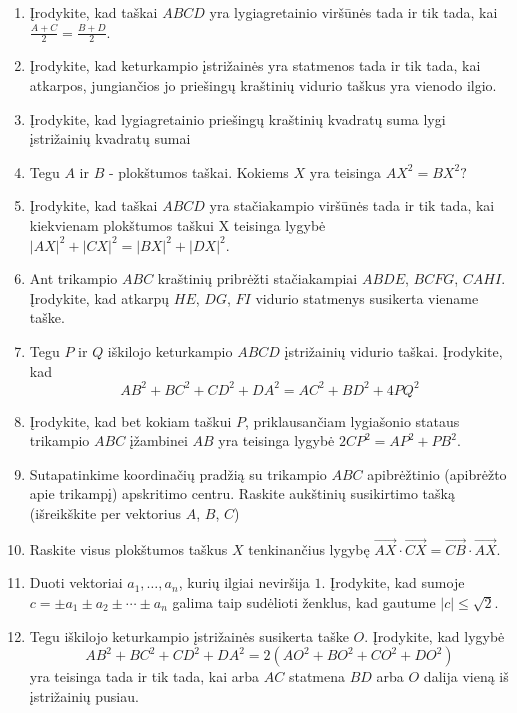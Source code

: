 \begin{enumerate}

\item Įrodykite, kad taškai $ABCD$ yra lygiagretainio viršūnės tada ir tik tada, kai $\frac{A+C}{2} = \frac{B+D}{2}$.

\item Įrodykite, kad keturkampio įstrižainės yra statmenos tada ir tik tada, kai atkarpos, jungiančios jo priešingų kraštinių vidurio taškus yra vienodo ilgio.

\item Įrodykite, kad lygiagretainio priešingų kraštinių kvadratų suma lygi įstrižainių kvadratų sumai

\item Tegu $A$ ir $B$ - plokštumos taškai. Kokiems $X$ yra teisinga $AX^2 = BX^2?$

\item Įrodykite, kad taškai $ABCD$ yra stačiakampio viršūnės tada ir tik tada, kai kiekvienam plokštumos taškui X teisinga lygybė $|AX|^2+ |CX|^2= |BX|^2+ |DX|^2$.

\item Ant trikampio $ABC$ kraštinių pribrėžti stačiakampiai $ABDE$, $BCFG$, $CAHI$. Įrodykite, kad atkarpų $HE$, $DG$, $FI$ vidurio statmenys susikerta viename taške. 

\item Tegu $P$ ir $Q$ iškilojo keturkampio $ABCD$ įstrižainių vidurio taškai. Įrodykite, kad $$AB^2 + BC^2 + CD^2 + DA^2 = AC^2 + BD^2 + 4PQ^2$$  

\item Įrodykite, kad bet kokiam taškui $P$, priklausančiam lygiašonio stataus trikampio $ABC$ įžambinei $AB$ yra teisinga lygybė $2CP^2 = AP^2 + PB^2.$

\item Sutapatinkime koordinačių pradžią su trikampio $ABC$ apibrėžtinio (apibrėžto apie trikampį) apskritimo centru. Raskite aukštinių susikirtimo tašką (išreikškite per vektorius $A$, $B$, $C$) 

\item Raskite visus plokštumos taškus $X$ tenkinančius lygybę $\vec{AX}\cdot\vec{CX} = \vec{CB}\cdot\vec{AX}.$

\item Duoti vektoriai $a_1, \dots, a_n$, kurių ilgiai neviršija $1$. Įrodykite, kad sumoje $c=\pm a_1 \pm a_2\pm \cdots \pm a_n$ galima taip sudėlioti ženklus, kad gautume $|c|\leq \sqrt{2}.$

\item Tegu iškilojo keturkampio įstrižainės susikerta taške $O$. Įrodykite, kad lygybė
$$AB^2 + BC^2 + CD^2 + DA^2 = 2(AO^2 + BO^2 + CO^2 + DO^2)$$
yra teisinga tada ir tik tada, kai arba $AC$ statmena $BD$ arba $O$ dalija vieną iš įstrižainių pusiau.


\end{enumerate}

